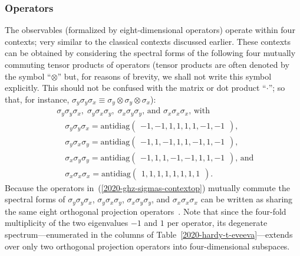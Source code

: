 \documentclass[sn-mathphys]{sn-jnl}%
\theoremstyle{thmstyleone}%
\theoremstyle{thmstyletwo}%
\theoremstyle{thmstylethree}%
\begin{document}
\subsubsection{Operators}
The observables (formalized by eight-dimensional operators) operate within four contexts;
very similar to the classical contexts discussed earlier.
These contexts can be obtained by considering the spectral forms
of the following
four mutually commuting tensor products of operators (tensor products are often denoted by the symbol ``$\otimes$''
but, for reasons of brevity, we shall not write this symbol explicitly.
This should not be confused with the matrix or dot product ``$\cdot$'';
so that, for instance,
$\sigma_y \sigma_y \sigma_x\equiv \sigma_y \otimes \sigma_y \otimes \sigma_x$):
\begin{equation}
\begin{aligned}
&\sigma_y \sigma_y \sigma_x ,\;
\sigma_y \sigma_x \sigma_y ,\;
\sigma_x \sigma_y \sigma_y
\textrm{, and }
\sigma_x \sigma_x \sigma_x \text{, with}\\
&\quad \sigma_y \sigma_y \sigma_x = \textrm{antidiag} \begin{pmatrix} -1, -1, 1, 1, 1, 1, -1, -1 \end{pmatrix},\\
&\quad \sigma_y \sigma_x \sigma_y = \textrm{antidiag} \begin{pmatrix} -1, 1, -1, 1, 1, -1, 1, -1 \end{pmatrix},\\
&\quad \sigma_x \sigma_y \sigma_y = \textrm{antidiag} \begin{pmatrix} -1, 1, 1, -1, -1, 1, 1, -1 \end{pmatrix}
\textrm{, and } \\
&\quad \sigma_x \sigma_x \sigma_x = \textrm{antidiag} \begin{pmatrix} 1, 1, 1, 1, 1, 1, 1, 1 \end{pmatrix}
.
\end{aligned}
\label{2020-ghz-sigmas-contextop}
\end{equation}
Because the operators in~(\ref{2020-ghz-sigmas-contextop}) mutually commute
the spectral forms
of
$\sigma_y \sigma_y \sigma_x$,
$\sigma_y \sigma_x \sigma_y$,
$\sigma_x \sigma_y \sigma_y$,
and
$\sigma_x \sigma_x \sigma_x$
can be written as sharing the same eight
orthogonal projection operators~\cite[Sections~79,84]{halmos-vs}.
Note that since the four-fold multiplicity of the two eigenvalues $-1$ and $1$ per operator,
its degenerate spectrum---enumerated in the columns of Table~\ref{2020-hardy-t-eveeva}---extends over only two orthogonal projection operators into four-dimensional subspaces.
\end{document}
